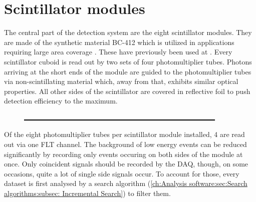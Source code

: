   
  \section{Scintillator modules}
  \label{ch:The muon detection system:sec:Scintillator modules}
  The central part of the detection system are the eight scintillator modules. They are made of the synthetic material BC-412 which is utilized in applications requiring large area coverage \cite{scintillatorManual}. These have previously been used at  . Every scintillator cuboid is read out by two sets of four photomultiplier tubes. Photons arriving at the short ends of the module are guided to the photomultiplier tubes via non-scintillating material which, away from that, exhibits similar optical properties. All other sides of the scintillator are covered in reflective foil to push detection efficiency to the maximum.
  \begin{figure}
    \centering
    \includegraphics[width = 0.9\textwidth]{graphics/dummy.eps}	
  \end{figure}
  Of the eight photomultiplier tubes per scintillator module installed, 4 are read out via one FLT channel. The background of low energy events can be reduced significantly by recording only events occuring on both sides of the module at once. Only coincident signals should be recorded by the DAQ, though, on some occasions, quite a lot of single side signals occur. To account for those, every dataset is first analysed by a search algorithm (\ref{ch:Analysis software:sec:Search algorithms:subsec: Incremental Search}) to filter them.
  

  
  
